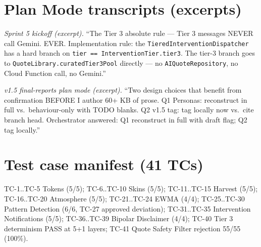 \documentclass[11pt,a4paper]{article}
\begin{document}
\section{Plan Mode transcripts (excerpts)}

\textit{Sprint 5 kickoff (excerpt).} ``The Tier 3 absolute rule --- Tier 3
messages NEVER call Gemini. EVER. Implementation rule: the
\texttt{TieredInterventionDispatcher} has a hard branch on \texttt{tier
== InterventionTier.tier3}. The tier-3 branch goes to
\texttt{QuoteLibrary.curatedTier3Pool} directly --- no
\texttt{AIQuoteRepository}, no Cloud Function call, no Gemini.''

\textit{v1.5 final-reports plan mode (excerpt).} ``Two design choices that
benefit from confirmation BEFORE I author 60+ KB of prose. Q1 Personas:
reconstruct in full vs.\ behaviour-only with TODO blanks. Q2 v1.5 tag:
tag locally now vs.\ cite branch head. Orchestrator answered: Q1
reconstruct in full with draft flag; Q2 tag locally.''

\section{Test case manifest (41 TCs)}

TC-1..TC-5 Tokens (5/5); TC-6..TC-10 Skins (5/5); TC-11..TC-15 Harvest
(5/5); TC-16..TC-20 Atmosphere (5/5); TC-21..TC-24 EWMA (4/4);
TC-25..TC-30 Pattern Detection (6/6, TC-27 approved deviation);
TC-31..TC-35 Intervention Notifications (5/5); TC-36..TC-39 Bipolar
Disclaimer (4/4); TC-40 Tier 3 determinism PASS at 5+1 layers; TC-41
Quote Safety Filter rejection 55/55 (100\%).
\end{document}
